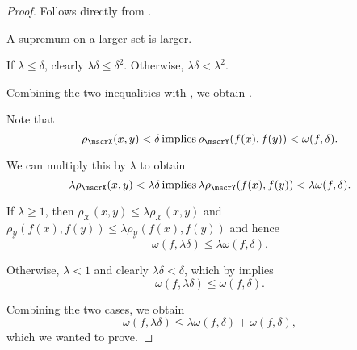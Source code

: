 \begin{proof}
   Follows directly from .

   A supremum on a larger set is larger.

   If \( \lambda \leq \delta \), clearly \( \lambda \delta \leq \delta^2 \). Otherwise, \( \lambda \delta < \lambda^2 \).

  Combining the two inequalities with , we obtain .

   Note that
  \begin{equation*}
    \rho_{\mscrX}(x, y) < \delta \T{implies} \rho_{\mscrY}(f(x), f(y)) < \omega(f, \delta).
  \end{equation*}

  We can multiply this by \( \lambda \) to obtain
  \begin{equation*}
    \lambda \rho_{\mscrX}(x, y) < \lambda \delta \T{implies} \lambda \rho_{\mscrY}(f(x), f(y)) < \lambda \omega(f, \delta).
  \end{equation*}

  If \( \lambda \geq 1 \), then \( \rho_{\mscrX}(x, y) \leq \lambda \rho_{\mscrX}(x, y) \) and \( \rho_{\mscrY}(f(x), f(y)) \leq \lambda \rho_{\mscrY}(f(x), f(y)) \) and hence
  \begin{equation*}
    \omega(f, \lambda \delta) \leq \lambda \omega(f, \delta).
  \end{equation*}

  Otherwise, \( \lambda < 1 \) and clearly \( \lambda \delta < \delta \), which by  implies
  \begin{equation*}
    \omega(f, \lambda \delta) \leq \omega(f, \delta).
  \end{equation*}

  Combining the two cases, we obtain
  \begin{equation*}
    \omega(f, \lambda \delta) \leq \lambda \omega(f, \delta) + \omega(f, \delta),
  \end{equation*}
  which we wanted to prove.
\end{proof}
